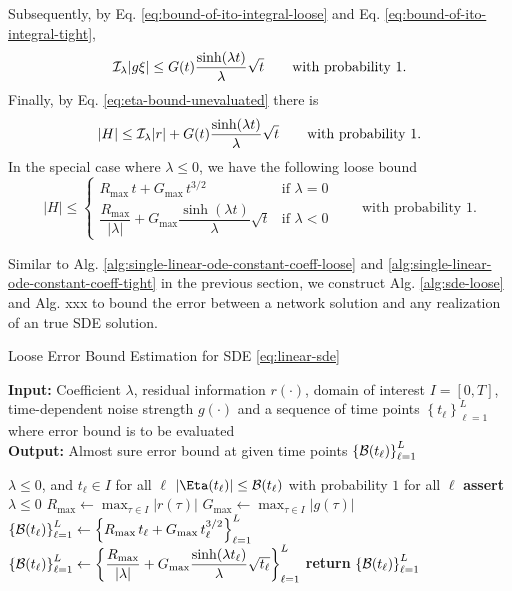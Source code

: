     Subsequently, by Eq. \eqref{eq:bound-of-ito-integral-loose} and Eq. \eqref{eq:bound-of-ito-integral-tight}, 
    \begin{equation}
        \mathcal{I}_{\lambda} |g\xi| \leq G(t) \dfrac{\sinh(\lambda t)}{\lambda} \sqrt{t} \quad\quad \text{with probability } 1.
    \end{equation}
    Finally, by Eq. \eqref{eq:eta-bound-unevaluated} there is
    \begin{equation}
        |H| \leq \mathcal{I}_{\lambda} |r| + G(t)\dfrac{\sinh(\lambda t)}{\lambda} \sqrt{t}  \quad\quad \text{with probability } 1.
    \end{equation}
    In the special case where $\lambda \leq 0$, we have the following loose bound
    \begin{equation}
        |H| \leq \begin{cases}
            R_{\max}\, t + G_{\max}\, t^{3/2} & \text{if } \lambda = 0 \\
            \dfrac{R_{\max}}{|\lambda|} + G_{\max} \dfrac{\sinh(\lambda t)}{\lambda} \sqrt{t}& \text{if } \lambda < 0 
        \end{cases}
        \quad \quad \text{with probability } 1.
    \end{equation}

    Similar to Alg. \ref{alg:single-linear-ode-constant-coeff-loose} and \ref{alg:single-linear-ode-constant-coeff-tight} in the previous section, we construct Alg. \ref{alg:sde-loose} and Alg. xxx to bound the error between a network solution and any realization of an true SDE solution.
    
    \begin{algorithm}
        \caption{Loose Error Bound Estimation for SDE \eqref{eq:linear-sde}}\label{alg:sde-loose}
        \textbf{Input:} Coefficient $\lambda$, residual information $r(\cdot)$, domain of interest $I = [0, T]$, time-dependent noise strength $g(\cdot)$ and a sequence of time points $\left\{t_\ell\right\}_{\ell=1}^{L}$ where error bound is to be evaluated\\
        \textbf{Output:} Almost sure error bound at given time points $\left\{\mathcal{B}(t_\ell)\right\}_{\ell=1}^{L}$
        \begin{algorithmic}
            \Require $\lambda \leq 0$, and $t_\ell \in I$ for all $\ell$
            \Ensure $\left|\Eta(t_\ell)\right| \leq \Bound(t_\ell)$ with probability $1$ for all $\ell$
            \State \textbf{assert} $\lambda \leq 0$
            \State $R_{\max} \gets \max_{\tau \in I} |r(\tau)|$ 
            \State $G_{\max} \gets \max_{\tau \in I} |g(\tau)|$ 
                \State $\left\{\mathcal{B}(t_\ell)\right\}_{\ell=1}^{L} \gets \left\{R_{\max}\, t_\ell + G_{\max}\, t_\ell^{3/2}\right\}_{\ell=1}^{L}$
            \Else
                \State $\left\{\mathcal{B}(t_\ell)\right\}_{\ell=1}^{L} \gets \left\{\dfrac{R_{\max}}{|\lambda|} + G_{\max} \dfrac{\sinh(\lambda t_\ell)}{\lambda} \sqrt{t_\ell}\right\}_{\ell=1}^{L}$
            \EndIf
            \State \textbf{return} $\left\{\mathcal{B}(t_\ell)\right\}_{\ell=1}^{L}$
        \end{algorithmic}
    \end{algorithm}
    
